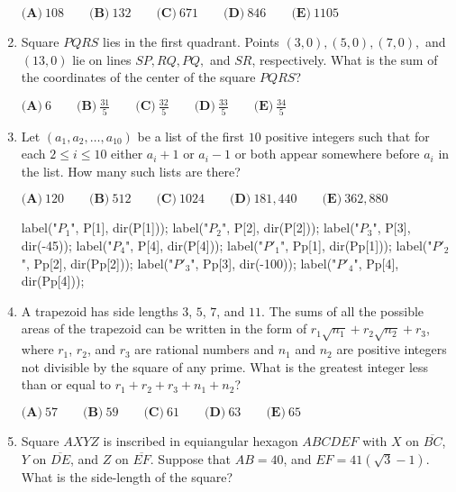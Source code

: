 \documentclass{article}
\begin{document}
\begin{enumerate}[label=\arabic*., itemsep=0.5em]
$\textbf{(A)}\ 108\qquad\textbf{(B)}\ 132\qquad\textbf{(C)}\ 671\qquad\textbf{(D)}\ 846\qquad\textbf{(E)}\ 1105 $\par \vspace{0.5em}\item Square $PQRS$ lies in the first quadrant. Points $(3,0), (5,0), (7,0),$ and $(13,0)$ lie on lines $SP, RQ, PQ,$ and $SR$, respectively. What is the sum of the coordinates of the center of the square $PQRS$?

$\textbf{(A)}\ 6\qquad\textbf{(B)}\ \frac{31}{5}\qquad\textbf{(C)}\ \frac{32}{5}\qquad\textbf{(D)}\ \frac{33}{5}\qquad\textbf{(E)}\ \frac{34}{5} $\par \vspace{0.5em}\item Let $(a_1,a_2, \dots ,a_{10})$ be a list of the first $10$ positive integers such that for each $2 \le i \le 10$ either $a_i+1$ or $a_i-1$ or both appear somewhere before $a_i$ in the list. How many such lists are there?

$\textbf{(A)}\ 120\qquad\textbf{(B)}\ 512\qquad\textbf{(C)}\ 1024\qquad\textbf{(D)}\ 181,440\qquad\textbf{(E)}\ 362,880$


label("$P_1$", P[1], dir(P[1]));
label("$P_2$", P[2], dir(P[2]));
label("$P_3$", P[3], dir(-45));
label("$P_4$", P[4], dir(P[4]));
label("$P'_1$", Pp[1], dir(Pp[1]));
label("$P'_2$", Pp[2], dir(Pp[2]));
label("$P'_3$", Pp[3], dir(-100));
label("$P'_4$", Pp[4], dir(Pp[4]));\par \vspace{0.5em}\item A trapezoid has side lengths $3$, $5$, $7$, and $11$. The sums of all the possible areas of the trapezoid can be written in the form of $r_1\sqrt{n_1}+r_2\sqrt{n_2}+r_3$, where $r_1$, $r_2$, and $r_3$ are rational numbers and $n_1$ and $n_2$ are positive integers not divisible by the square of any prime. What is the greatest integer less than or equal to $r_1+r_2+r_3+n_1+n_2$?

$\textbf{(A)}\ 57\qquad\textbf{(B)}\ 59\qquad\textbf{(C)}\ 61\qquad\textbf{(D)}\ 63\qquad\textbf{(E)}\ 65$\par \vspace{0.5em}\item Square $AXYZ$ is inscribed in equiangular hexagon $ABCDEF$ with $X$ on $\overline{BC}$, $Y$ on $\overline{DE}$, and $Z$ on $\overline{EF}$. Suppose that $AB=40$, and $EF=41(\sqrt{3}-1)$. What is the side-length of the square?



\end{enumerate}
\end{document}
